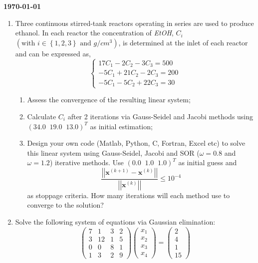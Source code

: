 \documentclass[12pts,a4paper,amsmath,amssymb,floatfix]{article}%
\renewcommand\le{\leqslant}
\newcommand{\frc}{\displaystyle\frac}
\begin{document}
\begin{flushright}
{\bf \today}
\end{flushright}

\begin{enumerate}[{\bf Problem 1:}]
%
\item Three continuous stirred-tank reactors operating in series are used to produce ethanol. In each reactor the concentration of {\it EtOH},  $C_{i}$ $\left(\text{with }i\in\left\{1, 2, 3\right\}\text{ and } g/cm^{3}\right)$, is determined at the inlet of each reactor and can be expressed as,
\begin{displaymath}
\begin{cases}
17C_{1} -2C_{2} - 3C_{3} = 500 \\
-5C_{1} + 21C_{2} - 2C_{3} = 200 \\
-5C_{1} - 5C_{2} + 22C_{3} = 30
\end{cases}
\end{displaymath}
\begin{enumerate}
\item Assess the convergence of the resulting linear system;
\item Calculate $C_{i}$ after 2 iterations via Gauss-Seidel and Jacobi methods using $\left(34.0\;\;19.0\;\;13.0\right)^{T}$ as initial estimation;
\item Design your own code (Matlab, Python, C, Fortran, Excel etc) to solve this linear system using Gauss-Seidel, Jacobi and SOR ($\omega=0.8$ and $\omega=1.2$) iterative methods. Use $\left(0.0\;\;1.0\;\;1.0\right)^{T}$ as initial guess and
\begin{displaymath}
\frc{\left|\left|\bm{x}^{(k+1)}-\bm{x}^{(k)}\right|\right|}{\left|\left|\bm{x}^{(k)}\right|\right|} \le 10^{-4}
\end{displaymath}
as stoppage criteria. How many iterations will each method use to converge to the solution? 
\end{enumerate} 

\item Solve the following system of equations via Gaussian elimination:
\begin{displaymath}
             \begin{pmatrix}
                7 & 1 & 3 & 2 \\ 3 & 12 & 1 & 5 \\ 0 & 0 & 8 & 1 \\ 1 & 3 & 2 & 9
             \end{pmatrix}
             \begin{pmatrix}
                x_{1} \\ x_{2} \\ x_{3} \\ x_{4}
             \end{pmatrix}=
             \begin{pmatrix}
                2 \\ 4 \\  1 \\ 15
             \end{pmatrix}
\end{displaymath}
%


\end{enumerate}
\end{document}
